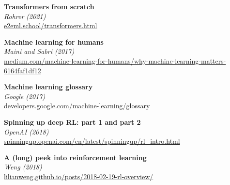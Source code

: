 \documentclass[12pt]{article}
\begin{document}
\vspace{1em}
% 
\noindent\textbf{ Transformers from scratch }\\
\textit{ Rohrer (2021) }\\
{\small \url{ e2eml.school/transformers.html }}

\vspace{1em}
% 
\noindent\textbf{ Machine learning for humans }\\
\textit{ Maini and Sabri (2017) }\\
{\small \url{ medium.com/machine-learning-for-humans/why-machine-learning-matters-6164faf1df12 }}

\vspace{1em}
% 
\noindent\textbf{ Machine learning glossary }\\
\textit{ Google (2017) }\\
{\small \url{ developers.google.com/machine-learning/glossary }}

\vspace{1em}
% 
\noindent\textbf{ Spinning up deep RL: part 1 and part 2 }\\
\textit{ OpenAI (2018) }\\
{\small \url{ spinningup.openai.com/en/latest/spinningup/rl_intro.html }}

\vspace{1em}
% 
\noindent\textbf{ A (long) peek into reinforcement learning }\\
\textit{ Weng (2018) }\\
{\small \url{ lilianweng.github.io/posts/2018-02-19-rl-overview/ }}

\vspace{1em}
% 
% 
\end{document}
